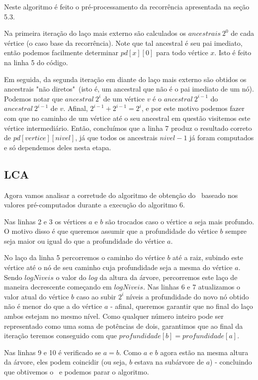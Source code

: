 Neste algoritmo é feito o pré-processamento da recorrência apresentada na seção 5.3.

Na primeira iteração do laço mais externo são calculados os $ancestrais\ 2^0$ de cada vértice (o caso base da recorrência). Note que tal ancestral é seu pai imediato, então podemos facilmente determinar $pd[x][0]$ para todo vértice $x$. Isto é feito na linha 5 do código.

Em seguida, da segunda iteração em diante do laço mais externo são obtidos os ancestrais "não diretos"\ (isto é, um ancestral que não é o pai imediato de um nó). Podemos notar que $ancestral\ 2^i$ de um vértice $v$ é o $ancestral\ 2^{i-1}$ do $ancestral\ 2^{i-1}$ de $v$. Afinal, $2^{i-1} + 2^{i-1} = 2^i$, e por este motivo podemos fazer com que no caminho de um vértice até o seu ancestral em questão visitemos este vértice intermediário. Então, concluímos que a linha 7 produz o resultado correto de $pd[vertice][nivel]$, já que todos os ancestrais $nivel - 1$ já foram computados e só dependemos deles nesta etapa.


\subsection{LCA}

Agora vamos analisar a corretude do algoritmo de obtenção do \LCA\ baseado nos valores pré-computados durante a execução do algoritmo 6.

Nas linhas 2 e 3 os vértices $a$ e $b$ são trocados caso o vértice $a$ seja mais profundo. O motivo disso é que queremos assumir que a profundidade do vértice $b$ sempre seja maior ou igual do que a profundidade do vértice $a$.

No laço da linha 5 percorremos o caminho do vértice $b$ até a raiz, subindo este vértice até o nó de seu caminho cuja profundidade seja a mesma do vértice $a$. Sendo $logNiveis$ o valor do $log$ da altura da árvore, percorremos este laço de maneira decrescente começando em $logNiveis$. Nas linhas 6 e 7 atualizamos o valor atual do vértice $b$ caso ao subir $2^i$ níveis a profundidade do novo nó obtido não é menor do que a do vértice $a$ - afinal, queremos garantir que no final do laço ambos estejam no mesmo nível. Como qualquer número inteiro pode ser representado como uma soma de potências de dois, garantimos que ao final da iteração teremos conseguido com que $profundidade[b] = profundidade[a]$.

Nas linhas 9 e 10 é verificado se $a = b$. Como $a$ e $b$ agora estão na mesma altura da árvore, eles podem coincidir (ou seja, $b$ estava na subárvore de $a$) - concluindo que obtivemos o \LCA\ e podemos parar o algoritmo.

